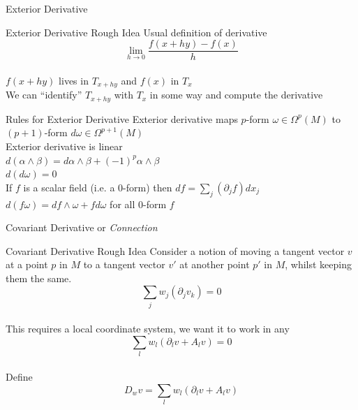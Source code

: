 \documentclass{beamer}
\begin{document}
  \begin{frame}{Exterior Derivative}
      \linespread{0.7}
      \pause
      \begin{block}{Exterior Derivative Rough Idea}
          Usual definition of derivative
          $$\lim_{h \rightarrow 0}\frac{f(x + hy) - f(x)}{h}$$ \pause \\
          $f(x + hy)$ lives in $T_{x + hy}$ and $f(x)$ in $T_x$ \pause \\
          We can ``identify'' $T_{x+hy}$ with $T_x$ in some way and compute the
          derivative
      \end{block}
      \pause
      \begin{block}{Rules for Exterior Derivative}
          Exterior derivative maps $p$-form $\omega \in \Omega^p(M)$ to
          $(p+1)$-form $d\omega \in \Omega^{p+1}(M)$ \pause \\
          Exterior derivative is linear \pause \\
          $d(\alpha \wedge \beta) = d\alpha \wedge \beta + (-1)^p \alpha \wedge
          \beta$ \pause \\
          $d(d\omega) = 0$ \pause \\
          If $f$ is a scalar field (i.e. a 0-form) then $df = \sum_j
          (\partial_j f)dx_j$ \pause \\
          $d(f\omega) = df \wedge \omega + f d\omega$ for all 0-form $f$
      \end{block}
  \end{frame}
  \begin{frame}{Covariant Derivative or \textit{Connection}}
      \begin{block}{Covariant Derivative Rough Idea}
          Consider a notion of moving a tangent vector $v$ at a point $p$ in
          $M$ to a tangent vector $v'$ at another point $p'$ in $M$, whilst
          keeping them the same. \pause \\
          $$\sum_j w_j (\partial_j v_k) = 0$$ \pause \\
          This requires a local coordinate system, we want it to work in any
          \pause \\
          $$\sum_l w_l(\partial_l v + A_l v) = 0$$ \pause \\
          Define $$D_w v = \sum_l w_l ( \partial_l v + A_l v)$$
      \end{block}
  \end{frame}
\end{document}
